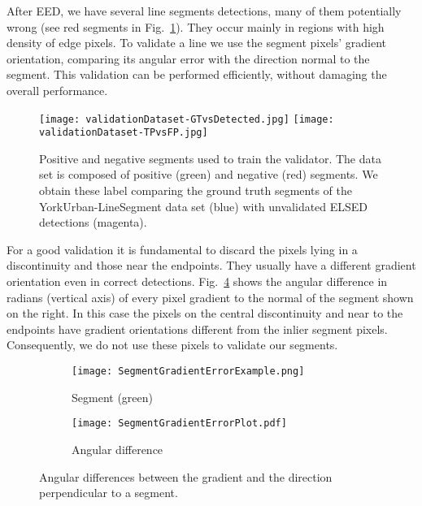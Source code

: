 \documentclass[preprint,12pt]{elsarticle}
\begin{document}
After EED, we have several line segments detections, many of them potentially wrong (see red segments in Fig.~\ref{fig:positive-and-negative-labels-for-validation}). They occur mainly in regions with high density of edge pixels.
To validate a line 
we use the segment pixels' gradient orientation, comparing its angular error with the direction normal to the segment. This validation can be performed efficiently, without damaging the overall performance.

\begin{figure}
  \centering
  \texttt{[image: validationDataset-GTvsDetected.jpg]}
  \texttt{[image: validationDataset-TPvsFP.jpg]}
  \caption{Positive and negative segments used to train the validator. The data set is composed of positive (green) and negative (red) segments. We obtain these label comparing the ground truth segments of the YorkUrban-LineSegment data set (blue) with unvalidated ELSED detections (magenta).}
  \label{fig:positive-and-negative-labels-for-validation}
\end{figure}

For a good validation it is fundamental to discard the pixels lying in a discontinuity and those near the endpoints. They usually have a different gradient orientation even in correct detections. Fig.~\ref{fig:errors-in-gradient-orientation} shows the angular difference in radians (vertical axis) of every pixel gradient to the normal of the segment shown on the right. In this case the pixels on the central discontinuity and near to the endpoints have gradient orientations different from the inlier segment pixels. Consequently, we do not use these pixels to validate our segments.

\begin{figure}
    \centering
    \begin{subfigure}{0.32\textwidth}
    \centering
    \texttt{[image: SegmentGradientErrorExample.png]}
    \caption{Segment (green)}
    \label{fig:errors-in-gradient-orientation:example}
    \end{subfigure}
    \begin{subfigure}{0.40\textwidth}
    \centering
    \texttt{[image: SegmentGradientErrorPlot.pdf]}
    \caption{Angular difference}\label{fig:errors-in-gradient-orientation:plot}
    \end{subfigure}
    \caption{Angular differences between the gradient and the direction perpendicular to a segment.  
    }
    \label{fig:errors-in-gradient-orientation}
\end{figure}
\end{document}
